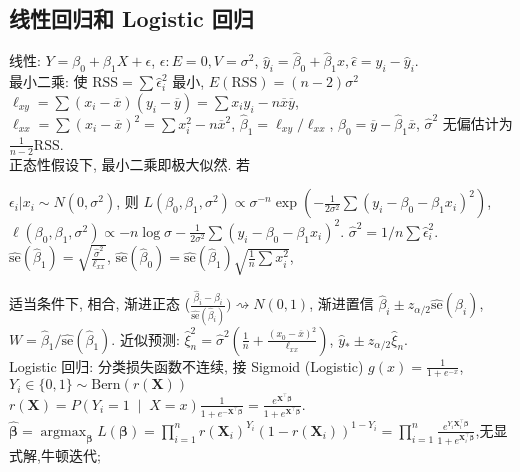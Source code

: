 \documentclass[a4paper, landscape,10pt]{article}
\renewcommand{\mid}{\;\middle\vert\;} \newcommand{\cmid}{\,:\,}
\begin{document}
\begin{multicols}{4}
\setcounter{section}{12}
\section{线性回归和 Logistic 回归}
\begin{scriptsize}
线性: $Y = \beta_0 + \beta_1 X + \epsilon$, $\epsilon : E=0, V=\sigma^2$,
$\hat y_i = \hat \beta_0 + \hat \beta_1 x, \hat \epsilon = y_i - \hat y_i$.\\
最小二乘: 使 $\mathrm{RSS} = \sum \hat \epsilon_i^2$ 最小, $E(\mathrm{RSS}) = (n - 2)\sigma^2$ \\
$\ell_{xy}= \sum (x_i - \overline x)(y_i - \overline y) = \sum x_i y_i - n \overline x \overline y$, 
$\ell_{xx} = \sum (x_i - \overline x)^2 = \sum x_i^2 - n \overline x^2$,
$\hat \beta_1 = \ell_{xy} / \ell_{xx}$, $\hat \beta_0 = \overline y - \hat \beta_1 \overline x$, $\hat \sigma ^ 2$ 无偏估计为 $\frac{1}{n - 2} \mathrm{RSS}$. \\
正态性假设下, 最小二乘即极大似然. 若
\begin{tiny}
 $\epsilon_i | x_i \sim N(0, \sigma^2)$, 则
$L(\beta_0, \beta_1, \sigma^2) \propto \sigma^{-n} \exp \left( - \frac{1}{2\sigma^2} \sum (y_i - \beta_0 - \beta_1 x_i)^2 \right)$,
$\ell(\beta_0, \beta_1, \sigma^2) \propto -n \log \sigma - \frac{1}{2\sigma^2} \sum (y_i - \beta_0 - \beta_1 x_i)^2$.
$\hat \sigma^2 = 1/n \sum \hat \epsilon_i^2$.
$\hat {\mathrm{se}}(\hat \beta_1) = \sqrt{\frac{\hat \sigma^2}{\ell_{xx}}}$,
$\hat {\mathrm{se}}(\hat \beta_0) = \hat {\mathrm{se}}(\hat \beta_1) \sqrt{\frac{1}{n} \sum x_i^2}$,
\end{tiny}
适当条件下, 相合, 渐进正态 ($\frac{\hat \beta_i - \beta_i}{\hat{\mathrm{se}}(\hat\beta_i)}) \rightsquigarrow N(0, 1)$,
渐进置信 $\hat \beta_i \pm z_{\alpha/2} \hat{\mathrm{se}}(\hat\beta_i)$, $W=\hat \beta_1 / \hat{\mathrm{se}}(\hat\beta_1)$.
近似预测: $\hat \xi_n^2 = \hat \sigma^2 \left( \frac{1}{n} + \frac{(x_0 - \overline x)^2}{\ell_{xx}} \right)$, $\hat y_* \pm z_{\alpha/2} \hat \xi_n$. \\
Logistic 回归: 分类损失函数不连续, 接 Sigmoid (Logistic) $g(x) = \frac{1}{1 + e^{-x}}$, $Y_i\in\{0,1\}\sim \mathrm{Bern}(r(\boldsymbol{X}))$\\
$
r(\boldsymbol{X})=P\left(Y_i=1 \mid X=x\right) \frac{1}{1+e^{-\boldsymbol{X}^{\top} \boldsymbol{\beta}}}=\frac{e^{\boldsymbol{X}^{\top} \boldsymbol{\beta}}}{1+e^{\boldsymbol{X}^{\top} \boldsymbol{\beta}}} .
$\\
$\widehat{\boldsymbol{\beta}}={\operatorname{argmax}}_{\boldsymbol{\beta}}L(\boldsymbol{\beta})=\prod_{i=1}^n r\left(\boldsymbol{X}_i\right)^{Y_i}\left(1-r\left(\boldsymbol{X}_i\right)\right)^{1-Y_i}=\prod_{i=1}^n \frac{e^{Y_i \boldsymbol{X}_i^{\top} \boldsymbol{\beta}}}{1+e^{\boldsymbol{X}_i^{\top} \boldsymbol{\beta}}}$,无显式解,牛顿迭代;

\end{scriptsize}
\end{multicols}
\end{document}
